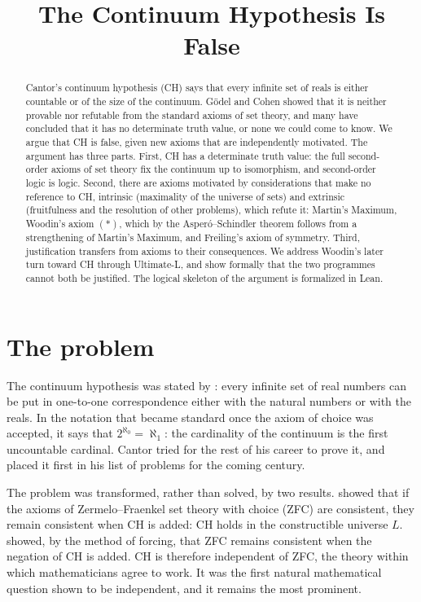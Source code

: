 \documentclass{situationist-preprint}
\title{The Continuum Hypothesis Is False}
\begin{document}
\maketitle

\begin{abstract}
Cantor's continuum hypothesis (CH) says that every infinite set of reals is either countable or of the size of the continuum. Gödel and Cohen showed that it is neither provable nor refutable from the standard axioms of set theory, and many have concluded that it has no determinate truth value, or none we could come to know. We argue that CH is false, given new axioms that are independently motivated. The argument has three parts. First, CH has a determinate truth value: the full second-order axioms of set theory fix the continuum up to isomorphism, and second-order logic is logic. Second, there are axioms motivated by considerations that make no reference to CH, intrinsic (maximality of the universe of sets) and extrinsic (fruitfulness and the resolution of other problems), which refute it: Martin's Maximum, Woodin's axiom $(*)$, which by the Asperó--Schindler theorem follows from a strengthening of Martin's Maximum, and Freiling's axiom of symmetry. Third, justification transfers from axioms to their consequences. We address Woodin's later turn toward CH through Ultimate-L, and show formally that the two programmes cannot both be justified. The logical skeleton of the argument is formalized in Lean.
\end{abstract}

\section{The problem}\label{s:problem}

The continuum hypothesis was stated by \citet{Cantor1878}: every infinite set of real numbers can be put in one-to-one correspondence either with the natural numbers or with the reals. In the notation that became standard once the axiom of choice was accepted, it says that $2^{\aleph_0} = \aleph_1$: the cardinality of the continuum is the first uncountable cardinal. Cantor tried for the rest of his career to prove it, and \citet{Hilbert1900} placed it first in his list of problems for the coming century.

The problem was transformed, rather than solved, by two results. \citet{Godel1938,Godel1940} showed that if the axioms of Zermelo--Fraenkel set theory with choice (ZFC) are consistent, they remain consistent when CH is added: CH holds in the constructible universe $L$. \citet{Cohen1963,Cohen1966} showed, by the method of forcing, that ZFC remains consistent when the negation of CH is added. CH is therefore independent of ZFC, the theory within which mathematicians agree to work. It was the first natural mathematical question shown to be independent, and it remains the most prominent.
\end{document}
